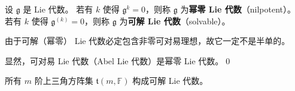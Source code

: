 
\begin{definition}
设 $\mathfrak{g}$ 是 Lie 代数。
若有 $k$ 使得 $\mathfrak{g}^k=0$，则称 $\mathfrak{g}$ 为\textbf{幂零 Lie 代数}（nilpotent）。
若有 $k$ 使得 $\mathfrak{g}^{(k)}=0$，则称 $\mathfrak{g}$ 为\textbf{可解 Lie 代数}（solvable）。
\end{definition}

由于可解（幂零） Lie 代数必定包含非零可对易理想，故它一定不是半单的。

\begin{example}
显然，可对易 Lie 代数（Abel Lie 代数）是幂零 Lie 代数。\qed
\end{example}

\begin{example}
    所有 $m$ 阶上三角方阵集 $\mathfrak{t}(m, \mathbb{F})$ 构成可解 Lie 代数。
\end{example}

